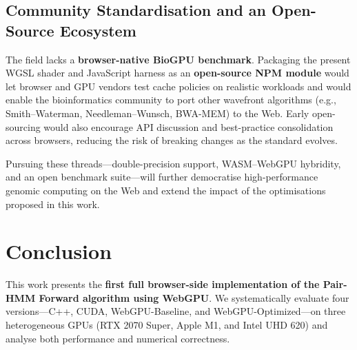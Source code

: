 \documentclass[PhD]{PHlab-thesis}
\begin{document}
\section{Community Standardisation and an Open-Source Ecosystem}
The field lacks a \textbf{browser-native BioGPU benchmark}. Packaging the present WGSL shader and JavaScript harness as an \textbf{open-source NPM module} would let browser and GPU vendors test cache policies on realistic workloads and would enable the bioinformatics community to port other wavefront algorithms (e.g., Smith–Waterman, Needleman–Wunsch, BWA-MEM) to the Web. Early open-sourcing would also encourage API discussion and best-practice consolidation across browsers, reducing the risk of breaking changes as the standard evolves.

Pursuing these threads—double-precision support, WASM–WebGPU hybridity, and an open benchmark suite—will further democratise high-performance genomic computing on the Web and extend the impact of the optimisations proposed in this work.

\chapter{Conclusion}
This work presents the \textbf{first full browser-side implementation of the Pair-HMM Forward algorithm using WebGPU}. We systematically evaluate four versions—C++, CUDA, WebGPU-Baseline, and WebGPU-Optimized—on three heterogeneous GPUs (RTX 2070 Super, Apple M1, and Intel UHD 620) and analyse both performance and numerical correctness.
\end{document}
